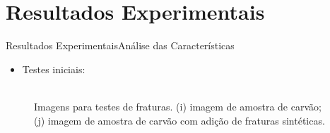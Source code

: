 \documentclass{beamer}
\begin{document}
\section{Resultados Experimentais}

\begin{frame}{Resultados Experimentais}{Análise das Características}
    
    \begin{itemize}
        \item Testes iniciais:
    \end{itemize}
        
    \begin{figure}[!htb]
    \centering
     \hspace*{0.1cm}
    \\
    \scriptsize{Imagens para testes de fraturas. (i) imagem de amostra de carvão; (j) imagem de amostra de carvão com adição de fraturas sintéticas.}
    \label{fig:img_testes}
    \end{figure}
\end{frame}
\end{document}
